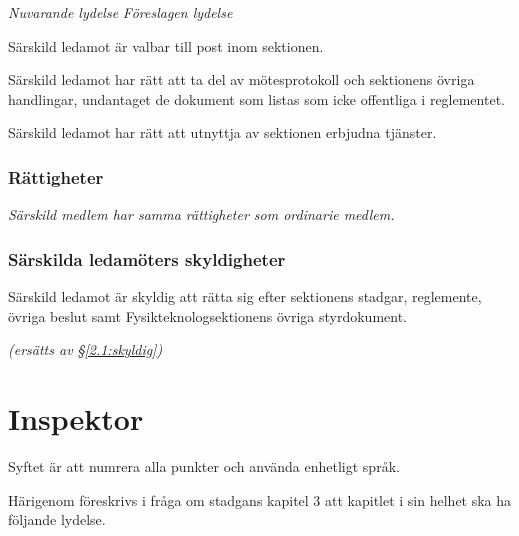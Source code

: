 \documentclass{article}
\newenvironment{lydelse}
    {\begin{paracol}{2}%
        \emph{Nuvarande lydelse}%
        \switchcolumn%
        \emph{Föreslagen lydelse}%
    \end{paracol}%
    \begin{enumerate}[label=\thesubsection.\arabic*]%
    \begin{paracol}{2}%
    }{\end{paracol}\end{enumerate}}
\newcommand{\itemb}{\item[\textbullet]}
\begin{document}
\begin{lydelse}
  \itemb Särskild ledamot är valbar till post inom sektionen.

   \itemb Särskild ledamot har rätt att ta del av mötesprotokoll och
   sektionens övriga handlingar, undantaget de dokument som listas som icke offentliga i reglementet.

  \itemb Särskild ledamot har rätt att utnyttja av sektionen erbjudna
   tjänster.
    
\switchcolumn
    \subsubsection*{Rättigheter}%

  


    \item \emph{Särskild medlem har samma rättigheter som ordinarie medlem.}

\switchcolumn*
    \subsubsection*{Särskilda ledamöters skyldigheter}%
    \itemb Särskild ledamot är skyldig att rätta sig efter sektionens stadgar,
  regle\-mente, övriga beslut samt  Fysikteknologsektionens övriga styrdokument.
    
\switchcolumn
    \emph{(ersätts av \S \ref{2.1:skyldig})}
\end{lydelse}

\section{Inspektor}
Syftet är att numrera alla punkter och använda enhetligt språk.

Härigenom föreskrivs i fråga om stadgans kapitel 3 att kapitlet i sin helhet ska ha följande lydelse.
\end{document}
